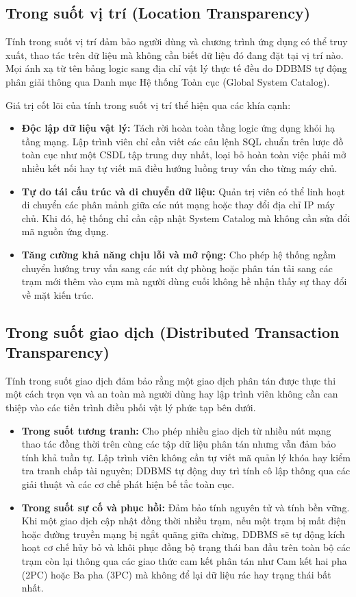 \documentclass[12pt,a4paper]{report}
\begin{document}
\subsection{Trong suốt vị trí (Location Transparency)}
Tính trong suốt vị trí đảm bảo người dùng và chương trình ứng dụng có thể truy xuất, thao tác trên dữ liệu mà không cần biết dữ liệu đó đang đặt tại vị trí nào. Mọi ánh xạ từ tên bảng logic sang địa chỉ vật lý thực tế đều do DDBMS tự động phân giải thông qua Danh mục Hệ thống Toàn cục (Global System Catalog).

Giá trị cốt lõi của tính trong suốt vị trí thể hiện qua các khía cạnh:
\begin{itemize}[leftmargin=0.8cm, topsep=2pt, itemsep=2pt]
    \item \textbf{Độc lập dữ liệu vật lý:} Tách rời hoàn toàn tầng logic ứng dụng khỏi hạ tầng mạng. Lập trình viên chỉ cần viết các câu lệnh SQL chuẩn trên lược đồ toàn cục như một CSDL tập trung duy nhất, loại bỏ hoàn toàn việc phải mở nhiều kết nối hay tự viết mã điều hướng luồng truy vấn cho từng máy chủ.
    \item \textbf{Tự do tái cấu trúc và di chuyển dữ liệu:} Quản trị viên có thể linh hoạt di chuyển các phân mảnh giữa các nút mạng hoặc thay đổi địa chỉ IP máy chủ. Khi đó, hệ thống chỉ cần cập nhật System Catalog mà không cần sửa đổi mã nguồn ứng dụng.
    \item \textbf{Tăng cường khả năng chịu lỗi và mở rộng:} Cho phép hệ thống ngầm chuyển hướng truy vấn sang các nút dự phòng hoặc phân tán tải sang các trạm mới thêm vào cụm mà người dùng cuối không hề nhận thấy sự thay đổi về mặt kiến trúc.
\end{itemize}

\subsection{Trong suốt giao dịch (Distributed Transaction Transparency)}
Tính trong suốt giao dịch đảm bảo rằng một giao dịch phân tán được thực thi một cách trọn vẹn và an toàn mà người dùng hay lập trình viên không cần can thiệp vào các tiến trình điều phối vật lý phức tạp bên dưới. 

\begin{itemize}[leftmargin=0.8cm, topsep=2pt, itemsep=2pt]
    \item \textbf{Trong suốt tương tranh:} Cho phép nhiều giao dịch từ nhiều nút mạng thao tác đồng thời trên cùng các tập dữ liệu phân tán nhưng vẫn đảm bảo tính khả tuần tự. Lập trình viên không cần tự viết mã quản lý khóa hay kiểm tra tranh chấp tài nguyên; DDBMS tự động duy trì tính cô lập thông qua các giải thuật và các cơ chế phát hiện bế tắc toàn cục.
    
    \item \textbf{Trong suốt sự cố và phục hồi:} Đảm bảo tính nguyên tử và tính bền vững. Khi một giao dịch cập nhật đồng thời nhiều trạm, nếu một trạm bị mất điện hoặc đường truyền mạng bị ngắt quãng giữa chừng, DDBMS sẽ tự động kích hoạt cơ chế hủy bỏ và khôi phục đồng bộ trạng thái ban đầu trên toàn bộ các trạm còn lại thông qua các giao thức cam kết phân tán như Cam kết hai pha (2PC) hoặc Ba pha (3PC) mà không để lại dữ liệu rác hay trạng thái bất nhất.
\end{itemize}
\end{document}

